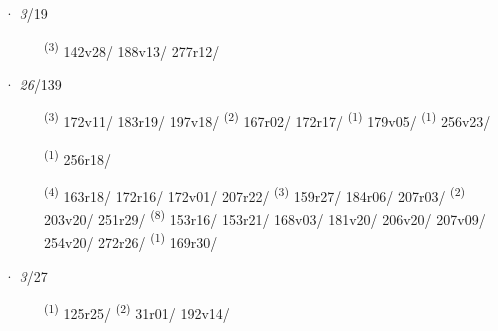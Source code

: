 \ENTRYEND
\noindent{} · \textit{3}/19 \LEMMALINE
\begin{description}
    \item[]  \textsuperscript{(3)} \mbox{142v28/} \mbox{188v13/} \mbox{277r12/}
\end{description}
\ENTRYEND
\noindent{} · \textit{26}/139 \LEMMALINE
\begin{description}
    \item[]  \textsuperscript{(3)} \mbox{172v11/} \mbox{183r19/} \mbox{197v18/} \CASEBREAK {} \textsuperscript{(2)} \mbox{167r02/} \mbox{172r17/} \textsuperscript{(1)} \mbox{179v05/} \textsuperscript{(1)} \mbox{256v23/}
    \item[]  \textsuperscript{(1)} \mbox{256r18/}
    \item[]  \textsuperscript{(4)} \mbox{163r18/} \mbox{172r16/} \mbox{172v01/} \mbox{207r22/} \CASEBREAK {} \textsuperscript{(3)} \mbox{159r27/} \mbox{184r06/} \mbox{207r03/} \CASEBREAK {} \textsuperscript{(2)} \mbox{203v20/} \mbox{251r29/} \CASEBREAK {} \textsuperscript{(8)} \mbox{153r16/} \mbox{153r21/} \mbox{168v03/} \mbox{181v20/} \mbox{206v20/} \mbox{207v09/} \mbox{254v20/} \mbox{272r26/} \textsuperscript{(1)} \mbox{169r30/}
\end{description}
\ENTRYEND
\noindent{} · \textit{3}/27 \LEMMALINE
\begin{description}
    \item[]  \textsuperscript{(1)} \mbox{125r25/} \CASEBREAK {} \textsuperscript{(2)} \mbox{31r01/} \mbox{192v14/}
\end{description}
